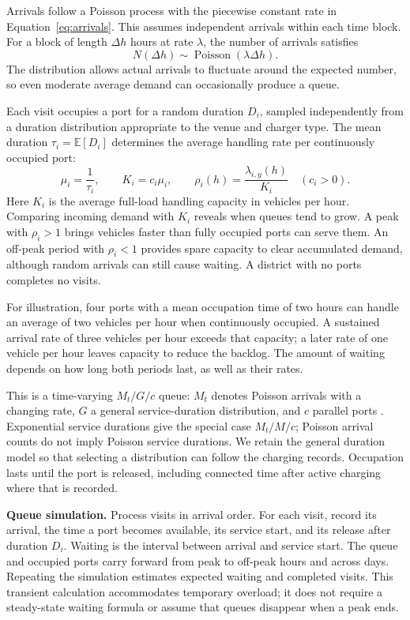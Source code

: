 \documentclass[12pt]{article}
\newcommand{\E}{\mathbb E}\newcommand{\ind}{\mathbf1}
\begin{document}
Arrivals follow a Poisson process with the piecewise constant rate in
Equation~\ref{eq:arrivals}. This assumes independent arrivals within each time block.
For a block of length $\Delta h$ hours at rate $\lambda$, the number of arrivals satisfies
\begin{equation}
N(\Delta h)\sim\operatorname{Poisson}(\lambda\Delta h).
\label{eq:poisson}
\end{equation}
The distribution allows actual arrivals to fluctuate around the expected number,
so even moderate average demand can occasionally produce a queue.

Each visit occupies a port for a random duration $D_i$, sampled independently from
a duration distribution appropriate to the venue and charger type. The mean duration
$\tau_i=\E[D_i]$ determines the average handling rate per continuously occupied port:
\begin{equation}
\mu_i=\frac{1}{\tau_i},\qquad
K_i=c_i\mu_i,\qquad
\rho_i(h)=\frac{\lambda_{i,y}(h)}{K_i}\quad(c_i>0).
\label{eq:handling}
\end{equation}
Here $K_i$ is the average full-load handling capacity in vehicles per hour. Comparing
incoming demand with $K_i$ reveals when queues tend to grow. A peak with $\rho_i>1$
brings vehicles faster than fully occupied ports can serve them. An off-peak period
with $\rho_i<1$ provides spare capacity to clear accumulated demand, although random
arrivals can still cause waiting. A district with no ports completes no visits.

For illustration, four ports with a mean occupation time of two hours can handle
an average of two vehicles per hour when continuously occupied. A sustained arrival
rate of three vehicles per hour exceeds that capacity; a later rate of one vehicle
per hour leaves capacity to reduce the backlog. The amount of waiting depends on
how long both periods last, as well as their rates.

This is a time-varying $M_t/G/c$ queue: $M_t$ denotes Poisson arrivals with a changing
rate, $G$ a general service-duration distribution, and $c$ parallel ports
\cite{LarsonOdoni}. Exponential service durations give the special case $M_t/M/c$;
Poisson arrival counts do not imply Poisson service durations. We retain the general
duration model so that selecting a distribution can follow the charging records.
Occupation lasts until the port is released, including connected time after active
charging where that is recorded.

\textbf{Queue simulation.} Process visits in arrival order. For each visit, record
its arrival, the time a port becomes available, its service start, and its release
after duration $D_i$. Waiting is the interval between arrival and service start.
The queue and occupied ports carry forward from peak to off-peak hours and across
days. Repeating the simulation estimates expected waiting and completed visits.
This transient calculation accommodates temporary overload; it does not require a
steady-state waiting formula or assume that queues disappear when a peak ends.
\end{document}
